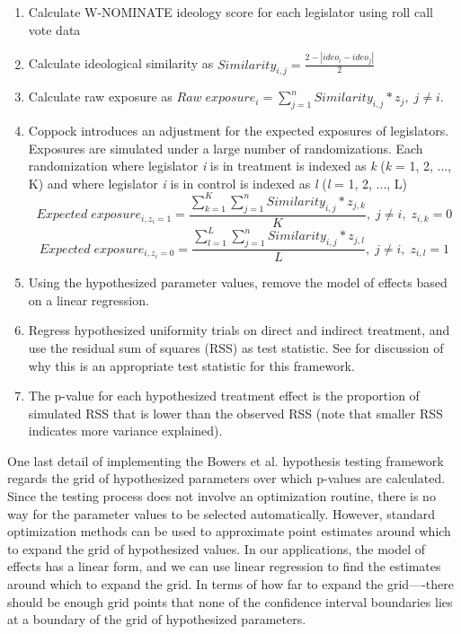 \documentclass[12pt]{article}
\begin{document}
\begin{enumerate}
\item Calculate W-NOMINATE ideology score for each legislator using roll call vote data

\item Calculate ideological similarity as $Similarity_{i,j} = \frac{2 - |ideo_i - ideo_j|}{2}$

\item Calculate raw exposure as $Raw\; exposure_i =  \sum_{j=1}^{n}Similarity_{i,j} * z_j, \; j \neq i$. 

\item Coppock introduces an adjustment for the expected exposures of legislators. Exposures are simulated under a large number of randomizations. Each randomization where legislator \textit{i} is in treatment is indexed as \textit{k} (\textit{k} = 1, 2, ..., K) and where legislator \textit{i} is in control is indexed as \textit{l} (\textit{l} = 1, 2, ..., L) $$Expected \; exposure_{i, z_i=1} =  \frac{\sum_{k=1}^{K}\sum_{j=1}^{n}Similarity_{i,j} * z_{j,k}}{K}, \; j \neq i, \; z_{i,k}=0$$ $$Expected \; exposure_{i, z_i=0} =  \frac{\sum_{l=1}^{L}\sum_{j=1}^{n}Similarity_{i,j} * z_{j,l}}{L}, \; j \neq i, \; z_{i,l}=1$$

\item Using the hypothesized parameter values, remove  the model of effects based on a linear regression.

\item Regress hypothesized uniformity trials on direct and indirect treatment, and use the residual sum of squares (RSS) as test statistic. See\citet{bowers2016research} for discussion of why this is an appropriate test statistic for this framework.

\item The p-value for each hypothesized treatment effect is the proportion of simulated RSS that is lower than the observed RSS (note that smaller RSS indicates more variance explained).
\end{enumerate}

One last detail of implementing the Bowers et al. hypothesis testing framework regards the grid of hypothesized parameters over which p-values are calculated. Since the testing process does not involve an optimization routine, there is no way for the parameter values to be selected automatically. However, standard optimization methods can be used to approximate point estimates around which to expand the grid of hypothesized values. In our applications, the model of effects has a linear form, and we can use linear regression to find the estimates around which to expand the grid. In terms of how far to expand the grid----there should be enough grid points that none of the confidence interval boundaries lies at a boundary of the grid of hypothesized parameters.
\end{document}

